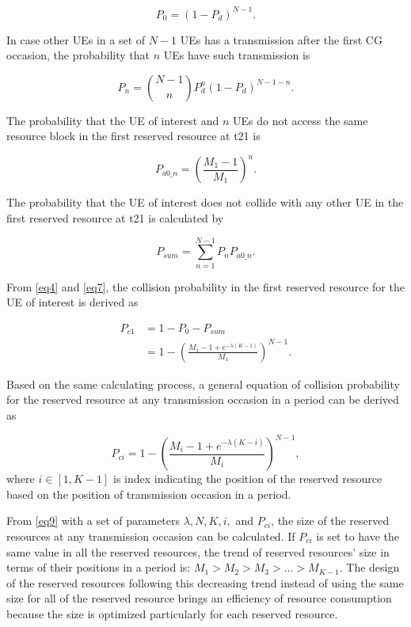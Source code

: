 \documentclass{ieeeaccess}
\begin{document}
\begin{equation}
P_{0} = (1-P_{d})^{N-1}.\label{eq4}
\end{equation}

In case other UEs in a set of $N-1$ UEs has a transmission after the first CG occasion, the probability that $n$  UEs have such transmission is 

\begin{equation}
P_{n} = \binom {N-1}{n}P_{d}^{n}(1-P_{d})^{N-1-n}.\label{eq5}
\end{equation}

The probability that the UE of interest and $n$ UEs do not access the same resource block in the first reserved resource at t21 is 

\begin{equation}
P_{a0\_n} = \left(\frac {M_{1}-1}{M_{1}}\right)^{n}.\label{eq6}
\end{equation}

The probability that the UE of interest does not collide with any other UE in the first reserved resource at t21 is calculated by 

\begin{equation}
P_{sum} = \sum_{n=1}^{N-1} P_{n}P_{a0\_n}.\label{eq7}
\end{equation}

From \eqref{eq4} and \eqref{eq7}, the collision probability in the first reserved resource for the UE of interest is derived as 

\begin{align}
P_{c1} &= 1 - P_{0} - P_{sum} \nonumber\\
 &= 1 - \left(\frac{M_{1}-1+e^{-\lambda(K-1)}}{M_{1}}\right)^{N-1}.\label{eq8}
\end{align}

Based on the same calculating process, a general equation of collision probability for the reserved resource at any transmission occasion in a period can be derived as 

\begin{equation}
P_{ci} = 1 - \left(\frac{M_{i}-1+e^{-\lambda(K-i)}}{M_{i}}\right)^{N-1},\label{eq9}
\end{equation}
where
$i \in [1, K-1]$ is index indicating the position of the reserved resource based on the position of transmission occasion in a period.

From \eqref{eq9} with a set of parameters  $\lambda, N, K, i,$ and $P_{ci}$, the size of the reserved resources at any transmission occasion can be calculated. If $P_{ci}$ is set to have the same value in all the reserved resources, the trend of reserved resources' size in terms of their positions in a period is: $M_1 > M_2 > M_3 > ... > M_{K-1}$. The design of the reserved resources following this decreasing trend instead of using the same size for all of the reserved resource brings an efficiency of resource consumption because the size is optimized particularly for each reserved resource.
\end{document}
